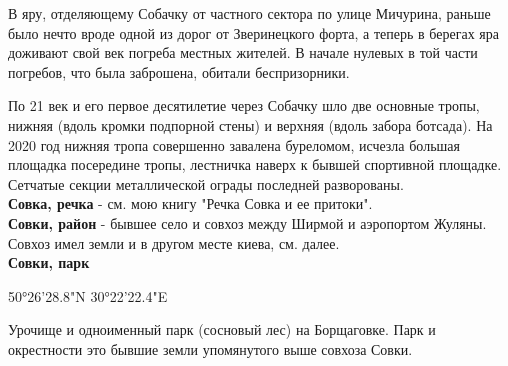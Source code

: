 В яру, отделяющему Собачку от частного сектора по улице Мичурина, раньше было нечто вроде одной из дорог от Зверинецкого форта, а теперь в берегах яра доживают свой век погреба местных жителей. В начале нулевых в той части погребов, что была заброшена, обитали беспризорники.

По 21 век и его первое десятилетие через Собачку шло две основные тропы, нижняя (вдоль кромки подпорной стены) и верхняя (вдоль забора ботсада). На 2020 год нижняя тропа совершенно завалена буреломом, исчезла большая площадка посередине тропы, лестничка наверх к бывшей спортивной площадке. Сетчатые секции металлической ограды последней разворованы.\\

\textbf{Совка, речка} - см. мою книгу "Речка Совка и ее притоки".\\

\textbf{Совки, район} - бывшее село и совхоз между Ширмой и аэропортом Жуляны. Совхоз имел земли и в другом месте киева, см. далее.\\

\textbf{Совки, парк}

50°26'28.8"N 30°22'22.4"E

Урочище и одноименный парк (сосновый лес) на Борщаговке. Парк и окрестности это бывшие земли упомянутого выше совхоза Совки.






